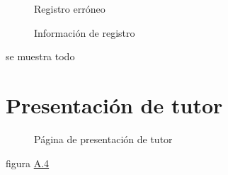 \documentclass[a4paper, 12pt]{book}
\begin{document}
\begin{figure}[htbp] 
  \label{figura:registro3}
  \centering
  \caption{Registro err\'oneo}
\end{figure}
\begin{figure}[htbp] 
  \label{figura:registro4}
  \centering
  \caption{Informaci\'on de registro}
\end{figure}
se muestra todo

\newpage
\section{Presentaci\'on de tutor}
\begin{figure}[htbp] 
  \label{figura:tutor}
  \centering
  \caption{P\'agina de presentaci\'on de tutor}
\end{figure}
figura \hyperref[figura:registro1]{A.4}
\newpage
\end{document}
